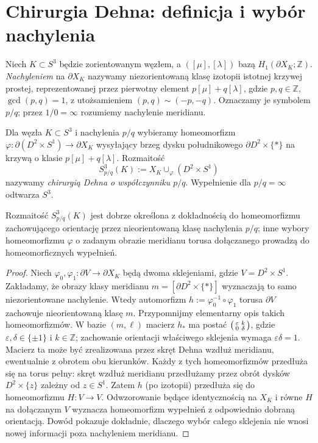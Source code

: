 \section{Chirurgia Dehna: definicja i wybór nachylenia}
\label{sec:kt-dehn}

\begin{definicja}
Niech $K\subset S^3$ będzie zorientowanym węzłem, a
$([\mu],[\lambda])$ bazą $H_1(\partial X_K;\mathbb Z)$.
\emph{Nachyleniem} na $\partial X_K$ nazywamy niezorientowaną
klasę izotopii istotnej krzywej prostej, reprezentowanej przez
pierwotny element $p[\mu]+q[\lambda]$, gdzie
$p,q\in\mathbb Z$, $\gcd(p,q)=1$, z utożsamieniem
$(p,q)\sim(-p,-q)$. Oznaczamy je symbolem $p/q$;
przez $1/0=\infty$ rozumiemy nachylenie meridianu.
\end{definicja}

\begin{definicja}
Dla węzła $K\subset S^3$ i nachylenia $p/q$ wybieramy
homeomorfizm $\varphi\colon\partial(D^2\times S^1)
\to\partial X_K$ wysyłający brzeg dysku południkowego
$\partial D^2\times\{*\}$ na krzywą o klasie
$p[\mu]+q[\lambda]$. Rozmaitość
\[
S^3_{p/q}(K):=X_K\cup_\varphi(D^2\times S^1)
\]
nazywamy \emph{chirurgią Dehna o współczynniku $p/q$}.
Wypełnienie dla $p/q=\infty$ odtwarza $S^3$.
\end{definicja}

\begin{stwierdzenie}
Rozmaitość $S^3_{p/q}(K)$ jest dobrze określona z dokładnością
do homeomorfizmu zachowującego orientację przez nieorientowaną
klasę nachylenia $p/q$; inne wybory homeomorfizmu
$\varphi$ o zadanym obrazie meridianu torusa dołączanego
prowadzą do homeomorficznych wypełnień.
\end{stwierdzenie}

\begin{proof}
Niech $\varphi_0,\varphi_1:\partial V\to\partial X_K$
będą dwoma sklejeniami, gdzie $V=D^2\times S^1$.
Zakładamy, że obrazy klasy meridianu $m=[\partial D^2\times\{*\}]$
wyznaczają to samo niezorientowane nachylenie. Wtedy
automorfizm $h:=\varphi_0^{-1}\circ\varphi_1$ torusa
$\partial V$ zachowuje nieorientowaną klasę $m$.
Przypomnijmy elementarny opis takich homeomorfizmów.
W bazie $(m,\ell)$ macierz $h_*$ ma postać
$\begin{psmallmatrix}\varepsilon & k\\ 0 & \delta\end{psmallmatrix}$,
gdzie $\varepsilon,\delta\in\{\pm1\}$ i $k\in\mathbb Z$;
zachowanie orientacji właściwego sklejenia wymaga
$\varepsilon\delta=1$. Macierz ta może być zrealizowana
przez skręt Dehna wzdłuż meridianu, ewentualnie z obrotem
obu kierunków. Każdy z tych homeomorfizmów przedłuża się
na torus pełny: skręt wzdłuż meridianu przedłużamy
przez obrót dysków $D^2\times\{z\}$ zależny od $z\in S^1$.
Zatem $h$ (po izotopii) przedłuża się do homeomorfizmu
$H:V\to V$. Odwzorowanie będące identycznością na $X_K$
i równe $H$ na dołączanym $V$ wyznacza homeomorfizm
wypełnień z odpowiednio dobraną orientacją.
Dowód pokazuje dokładnie, dlaczego wybór całego sklejenia
nie wnosi nowej informacji poza nachyleniem meridianu.
\end{proof}


